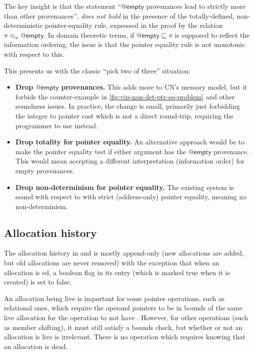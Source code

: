 The key insight is that the statement ``$@\mathsf{empty}$ provenances lead to
strictly more  than other provenances'', \emph{does not hold} in the
presence of the totally-defined, non-deterministic pointer-equality rule,
expressed in the proof by the relation $\pi \approx_w @\mathsf{empty}$. In
domain theoretic terms, if $@\mathsf{empty} \sqsubseteq \pi$ is supposed to
reflect the information ordering, the issue is that the pointer equality rule
is not monotonic with respect to this.

This presents us with the classic ``pick two of three'' situation:
\begin{itemize}
    \item \textbf{Drop $@\mathsf{empty}$ provenances.} This adds more 
        to CN's memory model, but it forbids the counter-example in
        \cref{fig:vip-non-det-ptr-eq-problem} and other soundness
        issues.
        In practice, the change is small, primarily just forbidding the integer
        to pointer cast which is not a direct round-trip, requiring the
        programmer to use  instead.
    \item \textbf{Drop totality for pointer equality.} An alternative approach
        would be to make the pointer equality test  if either argument
        has the $@\mathsf{empty}$ provenance. This would mean accepting a
        different interpretation (information order) for empty provenances.
    \item \textbf{Drop non-determinism for pointer equality.} The existing
         system is sound with respect to  with strict
        (address-only) pointer equality, meaning no non-determinism.
\end{itemize}

\subsection{Allocation history}\label{subsec:alloc-history}

The allocation history in  and  is mostly append-only
(new allocations are added, but old allocations are never removed) with the
exception that when an allocation is ed, a boolean flag in its
entry (which is marked true when it is created) is set to false.

An allocation being live is important for some pointer operations, such as
relational ones, which require the operand pointers to be in bounds of the same
live allocation for the operation to not have . However, for other
operations (such as member shifting), it must still satisfy a bounds check, but
whether or not an allocation is live is irrelevant. There is no operation which
requires knowing that an allocation is dead.

